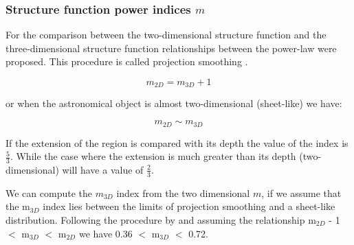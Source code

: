 \documentclass[fleqn,usenatbib, useAMS, a4paper]{mnras}
\begin{document}

\subsubsection{Structure function power indices \(m\)}


For the comparison between the two-dimensional structure function and the three-dimensional structure function relationships between the power-law were proposed.
This procedure is called projection smoothing \citep{von1951methode, munch1958internal,1987ApJ...317..686O}.

\begin{equation}\label{eq:exp1}
m_{2D}= m_{3D} + 1
\end{equation}

or when the astronomical object is almost two-dimensional (sheet-like) we have:

\begin{equation}\label{eq:exp2}
m_{2D} \sim m_{3D}
\end{equation}

If the extension of the region is compared with its depth the value of the index is $\frac{5}{3}$. While the case where the extension is much greater than its depth (two-dimensional) will have a value of $\frac{2}{3}$.

We can compute the $m_{3D}$ index from the two dimensional \(m\), if we assume that the m$_{3D}$ index lies between the limits of projection smoothing and a sheet-like distribution. 
Following the procedure by \cite{arthur2016turbulence} and assuming the relationship m$_{2D}$ - 1 $<$ m$_{3D}$ $<$ m$_{2D}$ we have 0.36 $<$ m$_{3D}$ $<$ 0.72.
\end{document}
